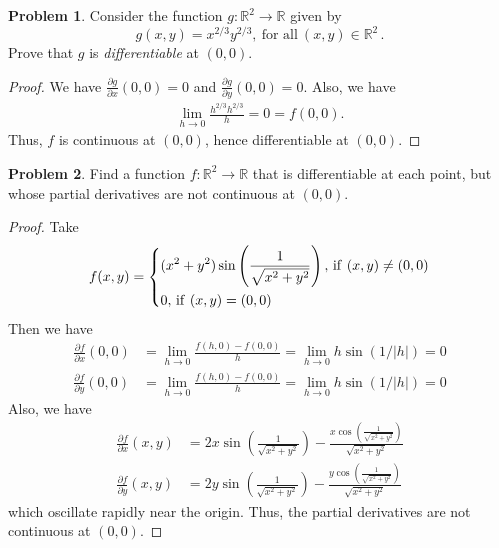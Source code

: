 \documentclass[11pt]{article}
\theoremstyle{definition}
\newtheorem{problem}{Problem}
\theoremstyle{definition}
\begin{document}
\medskip

\begin{problem}
Consider the function $g : \mathbb{R}^2 \to \mathbb{R}$ given by
$$
g(x, y) = x^{2/3}y^{2/3}, \ \text{for all} \ (x, y) \in \mathbb{R}^2 \,
.
$$
Prove that $g$ is {\it differentiable} at $(0, 0)$.
\end{problem}
\begin{proof}
We have $\frac{\partial g}{\partial x}(0,0) = 0$ and $\frac{\partial g}{\partial y}(0,0) = 0$. Also, we have
\begin{align*}
    \lim_{h\to0} \frac{h^{2/3}h^{2/3}}{h} = 0 = f(0,0).
\end{align*}
Thus, $f$ is continuous at $(0,0)$, hence differentiable at $(0,0)$.
\end{proof}

\medskip

\begin{problem}
Find a function $f:\mathbb{R}^2\to\mathbb{R}$ that is differentiable at each point,
but whose partial derivatives are not continuous at $(0,0)$.
\end{problem}
\begin{proof}
Take 
\begin{align*}
    f(x,y) = \left\{
    \begin{aligned}
        & (x^2 + y^2) \sin \left(\frac{1}{\sqrt{x^2 + y^2}}\right),\, {\rm if }\,\, (x,y)\neq (0,0)\\
        & 0, \, {\rm if }\,\, (x,y) = (0,0)
    \end{aligned}
    \right.
\end{align*}
Then we have 
\begin{align*}
    \frac{\partial f}{\partial x}(0,0) & = \lim_{h\to 0} \frac{f(h,0) - f(0,0)}{h} = \lim_{h\to 0} h \sin \left(1/|h|\right) = 0 \\
    \frac{\partial f}{\partial y}(0,0) & = \lim_{h\to 0} \frac{f(h,0) - f(0,0)}{h} = \lim_{h\to 0} h \sin \left(1/|h|\right) = 0 
\end{align*}
Also, we have
\begin{align*}
    \frac{\partial f}{\partial x}(x,y) & = 2x \sin \left(\frac{1}{\sqrt{x^2 + y^2}}\right) - \frac{x \cos \left(\frac{1}{\sqrt{x^2 + y^2}}\right)}{\sqrt{x^2 + y^2}} \\
    \frac{\partial f}{\partial y}(x,y) & = 2y \sin \left(\frac{1}{\sqrt{x^2 + y^2}}\right) - \frac{y \cos \left(\frac{1}{\sqrt{x^2 + y^2}}\right)}{\sqrt{x^2 + y^2}}
\end{align*}
which oscillate rapidly near the origin. Thus, the partial derivatives are not continuous at $(0,0)$.
\end{proof}
\end{document}
